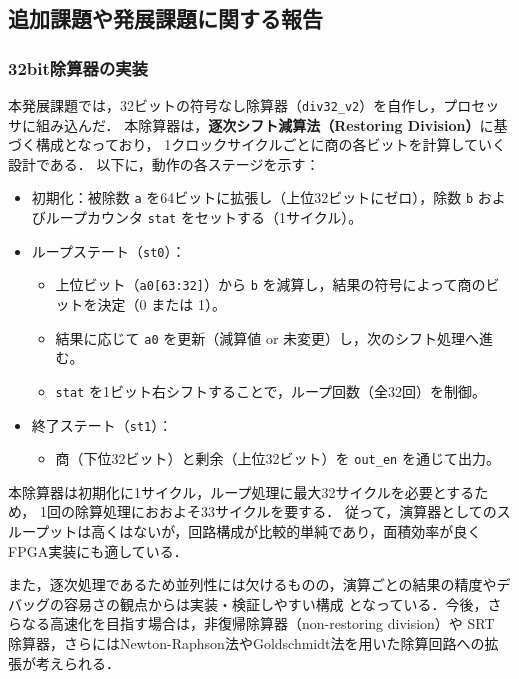 \documentclass[autodetect-engine,dvi=dvipdfmx,ja=standard,
               a4j,11pt]{bxjsarticle}
\begin{document}
     
\subsection{追加課題や発展課題に関する報告}\label{tuika_hatten}
\subsubsection{32bit除算器の実装}
本発展課題では，32ビットの符号なし除算器（\texttt{div32\_v2}）を自作し，プロセッサに組み込んだ．
本除算器は，\textbf{逐次シフト減算法（Restoring Division）}に基づく構成となっており，
1クロックサイクルごとに商の各ビットを計算していく設計である．
以下に，動作の各ステージを示す：

\begin{itemize}
  \item 初期化：被除数 \texttt{a} を64ビットに拡張し（上位32ビットにゼロ），除数 \texttt{b} およびループカウンタ \texttt{stat} をセットする（1サイクル）。
  \item ループステート（\texttt{st0}）：
  \begin{itemize}
    \item 上位ビット（\texttt{a0[63:32]}）から \texttt{b} を減算し，結果の符号によって商のビットを決定（0 または 1）。
    \item 結果に応じて \texttt{a0} を更新（減算値 or 未変更）し，次のシフト処理へ進む。
    \item \texttt{stat} を1ビット右シフトすることで，ループ回数（全32回）を制御。
  \end{itemize}
  \item 終了ステート（\texttt{st1}）：
  \begin{itemize}
    \item 商（下位32ビット）と剰余（上位32ビット）を \texttt{out\_en} を通じて出力。
  \end{itemize}
\end{itemize}
本除算器は初期化に1サイクル，ループ処理に最大32サイクルを必要とするため，
1回の除算処理におおよそ33サイクルを要する．
従って，演算器としてのスループットは高くはないが，回路構成が比較的単純であり，面積効率が良くFPGA実装にも適している．

また，逐次処理であるため並列性には欠けるものの，演算ごとの結果の精度やデバッグの容易さの観点からは実装・検証しやすい構成
となっている．今後，さらなる高速化を目指す場合は，非復帰除算器（non-restoring division）や 
SRT 除算器，さらにはNewton-Raphson法やGoldschmidt法を用いた除算回路への拡張が考えられる．
\end{document}

